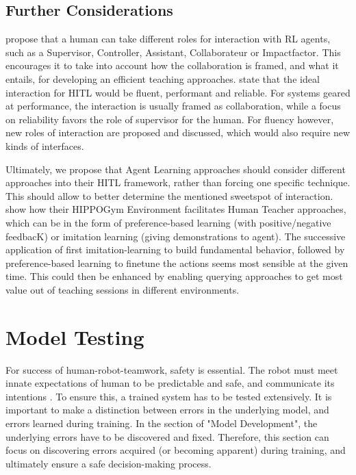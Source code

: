 \documentclass[twoside,11pt]{article}
\begin{document}
\subsection{Further Considerations}

\citet{WuEtAl:2021:HITLMLSurvey} propose that a human can take different roles for interaction with RL agents, such as a Supervisor, Controller, Assistant, Collaborateur or Impactfactor. This encourages it to take into account how the collaboration is framed, and what it entails, for developing an efficient teaching approaches.
\citet{WuEtAl:2021:HITLMLSurvey} state that the ideal interaction for HITL would be fluent, performant and reliable. For systems geared at performance, the interaction is usually framed as collaboration, while a focus on reliability favors the role of supervisor for the human. For fluency however, new roles of interaction are proposed and discussed, which would also require new kinds of interfaces.

Ultimately, we propose that Agent Learning approaches should consider different approaches into their HITL framework, rather than forcing one specific technique. This should allow to better determine the mentioned sweetspot of interaction. \citep{WuEtAl:2021:HITLMLSurvey} show how their HIPPOGym Environment facilitates Human Teacher approaches, which can be in the form of preference-based learning (with positive/negative feedbacK) or imitation learning (giving demonstrations to agent). The successive application of first imitation-learning to build fundamental behavior, followed by preference-based learning to finetune the actions seems most sensible at the given time. This could then be enhanced by enabling querying approaches to get most value out of teaching sessions in different environments.

\section{Model Testing}
For success of human-robot-teamwork, safety is essential. The robot must meet innate expectations of human to be predictable and safe, and communicate its intentions \cite{EderHarperLeonards:2014:HITLRoboticsSafetyAssurance}. To ensure this, a trained system has to be tested extensively. It is important to make a distinction between errors in the underlying model, and errors learned during training. In the section of "Model Development", the underlying errors have to be discovered and fixed. Therefore, this section can focus on discovering errors acquired (or becoming apparent) during training, and ultimately ensure a safe decision-making process.
\end{document}
